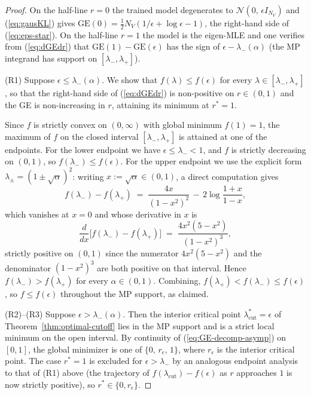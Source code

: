 \documentclass[10pt,a4paper]{amsart}
\newcommand{\NV}{N_V}
\begin{document}
\begin{proof}
On the half-line $r = 0$ the trained model degenerates to
$\mathcal{N}(0,\, \epsilon I_{\NV})$ and (\ref{eq:gausKL}) gives
$\mathrm{GE}(0) = \tfrac{1}{2}\NV(1/\epsilon + \log\epsilon - 1)$,
the right-hand side of (\ref{eq:eps-star}). On the half-line
$r = 1$ the model is the eigen-MLE and one verifies from
(\ref{eq:dGEdr}) that
$\mathrm{GE}(1) - \mathrm{GE}(\epsilon)$ has the sign of
$\epsilon - \lambda_{-}(\alpha)$ (the MP integrand has support
on $[\lambda_{-},\lambda_{+}]$).

(R1) Suppose $\epsilon \leq \lambda_{-}(\alpha)$. We show that
$f(\lambda) \leq f(\epsilon)$ for every $\lambda \in
[\lambda_{-}, \lambda_{+}]$, so that the right-hand side of
(\ref{eq:dGEdr}) is non-positive on $r \in (0,1)$ and the GE is
non-increasing in $r$, attaining its minimum at $r^{*} = 1$.

Since $f$ is strictly convex on $(0, \infty)$ with global
minimum $f(1) = 1$, the maximum of $f$ on the closed interval
$[\lambda_{-}, \lambda_{+}]$ is attained at one of the
endpoints. For the lower endpoint we have $\epsilon \leq
\lambda_{-} < 1$, and $f$ is strictly decreasing on $(0, 1)$,
so $f(\lambda_{-}) \leq f(\epsilon)$. For the upper endpoint
we use the explicit form $\lambda_{\pm} = (1 \pm \sqrt{\alpha})^{2}$:
writing $x := \sqrt{\alpha} \in (0, 1)$, a direct computation
gives
\begin{equation*}
  f(\lambda_{-}) - f(\lambda_{+})
  \;=\;
  \frac{4x}{(1-x^{2})^{2}}
  \,-\, 2\log\!\frac{1+x}{1-x},
\end{equation*}
which vanishes at $x = 0$ and whose derivative in $x$ is
\begin{equation*}
  \frac{d}{dx}\bigl[f(\lambda_{-}) - f(\lambda_{+})\bigr]
  \;=\;
  \frac{4x^{2}(5 - x^{2})}{(1 - x^{2})^{3}},
\end{equation*}
strictly positive on $(0, 1)$ since the numerator
$4x^{2}(5 - x^{2})$ and the denominator $(1 - x^{2})^{3}$ are
both positive on that interval. Hence
$f(\lambda_{-}) > f(\lambda_{+})$ for every
$\alpha \in (0, 1)$. Combining, $f(\lambda_{+}) <
f(\lambda_{-}) \leq f(\epsilon)$, so $f \leq f(\epsilon)$
throughout the MP support, as claimed.

(R2)--(R3) Suppose $\epsilon > \lambda_{-}(\alpha)$. Then the
interior critical point $\lambda_{\mathrm{cut}}^{*} = \epsilon$
of Theorem~\ref{thm:optimal-cutoff} lies in the MP support and
is a strict local minimum on the open interval. By continuity
of (\ref{eq:GE-decomp-asymp}) on $[0,1]$, the global minimizer
is one of $\{0,\, r_{\epsilon},\, 1\}$, where $r_{\epsilon}$
is the interior critical point. The case $r^{*} = 1$ is
excluded for $\epsilon > \lambda_{-}$ by an analogous endpoint
analysis to that of (R1) above (the trajectory of
$f(\lambda_{\mathrm{cut}}) - f(\epsilon)$ as $r$ approaches $1$
is now strictly positive), so $r^{*} \in \{0, r_{\epsilon}\}$.


\end{proof}
\end{document}
